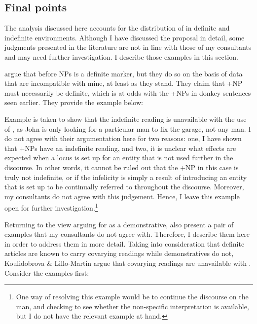 \documentclass[output=paper,
modfonts
]{langscibook}
\begin{document}
\subsection{Final points}

The analysis discussed here accounts for the distribution of  in definite and indefinite environments. Although I have discussed the proposal in detail, some judgments presented in the literature are not in line with those of my consultants and may need further investigation. I describe those examples in this section. \newpage

\citet{Bahanetal1995} argue that  before NPs is a definite marker, but they do so on the basis of data that are incompatible with mine, at least as they stand. They claim that +NP must necessarily be definite, which is at odds with the +NPs in donkey sentences seen earlier. They provide the example below: 

\begin{exe}
\end{exe}

Example  is taken to show that the indefinite reading is unavailable with the use of , as John is only looking for a particular man to fix the garage, not any man. I do not agree with their argumentation here for two reasons: one, I have shown that +NPs have an indefinite reading, and two, it is unclear what effects are expected when a locus is set up for an entity that is not used further in the discourse. In other words, it cannot be ruled out that the +NP  in this case is truly not indefinite, or if the infelicity is simply a result of introducing an entity that is set up to be continually referred to throughout the discourse. Moreover, my consultants do not agree with this judgement. Hence, I leave this example open for further investigation.\footnote{One way of resolving this example would be to continue the discourse on the man, and checking to see whether the non-specific interpretation is available, but I do not have the relevant example at hand.} 


Returning to the view arguing for  as a demonstrative, \citet{KoulidobrovaLilloMartin2016} also present a pair of examples that my consultants do not agree with. Therefore, I describe them here in order to address them in more detail. Taking into consideration that definite articles are known to carry covarying readings while demonstratives do not, Koulidobrova \& Lillo-Martin argue that covarying readings are unavailable with . Consider the  examples first:
\end{document}
